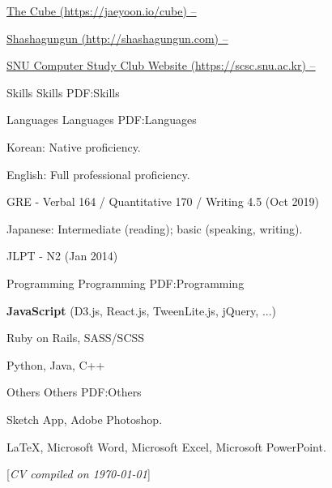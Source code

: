 \documentclass[letterpaper,MMMyyyy,nonstopmode]{template}
\newcommand{\CVNote}{CV compiled on {\today}}
\begin{document}
\begin{Body}
\BigGap
\BulletItem
\href{https://jaeyoon.io}
{The Cube (https://jaeyoon.io/cube)
\hfill
{} --
}

\BulletItem
\href{http://shashagungun.com}
{Shashagungun (http://shashagungun.com)
\hfill
{} --
}

\BulletItem
\href{http://scsc.snu.ac.kr}
{SNU Computer Study Club Website (https://scsc.snu.ac.kr)
\hfill
{} --
}

\BigGap
\Section
{Skills}
{Skills}
{PDF:Skills}

\SubSection
{Languages}
{Languages}
{PDF:Languages}

\BigGap
\BulletItem
Korean: Native proficiency.

\Gap
\BulletItem
English: Full professional proficiency.
\begin{Detail}
\SubBulletItem
GRE - Verbal 164 / Quantitative 170 / Writing 4.5 (Oct 2019)
\end{Detail}

\Gap
\BulletItem
Japanese: Intermediate (reading); basic (speaking, writing).
\begin{Detail}
\SubBulletItem
JLPT - N2 (Jan 2014)
\end{Detail}

\BigGap
\SubSection
{Programming}
{Programming}
{PDF:Programming}

\BigGap
\BulletItem
\textbf{JavaScript} (D3.js, React.js, TweenLite.js, jQuery, ...)

\Gap
\BulletItem
Ruby on Rails,
SASS/SCSS

\Gap
\BulletItem
Python, Java, C++

\BigGap
\SubSection
{Others}
{Others}
{PDF:Others}

\BigGap
\BulletItem
Sketch App,
Adobe Photoshop.

\Gap
\BulletItem
{\LaTeX},
Microsoft Word,
Microsoft Excel,
Microsoft PowerPoint.

\end{Body}


\BigGap
\UseNoteFont%
\null\hfill%
[\textit{\CVNote}]
\end{document}
